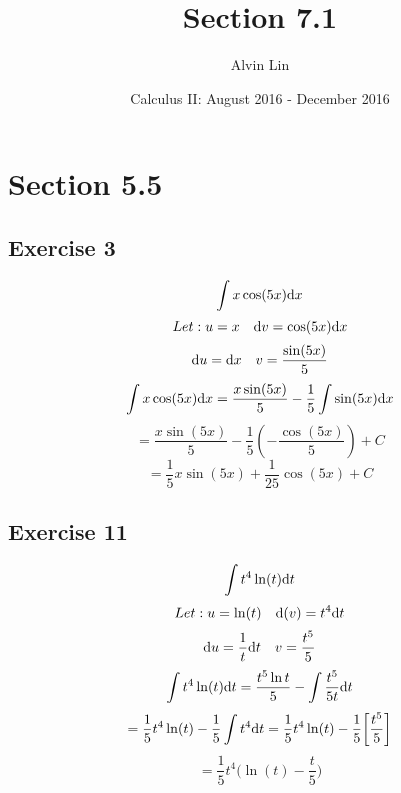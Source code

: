 \documentclass[letterpaper, 12pt]{math}
\title{Section 7.1}
\author{Alvin Lin}
\date{Calculus II: August 2016 - December 2016}
\begin{document}
\maketitle

\section*{Section 5.5}

\subsection*{Exercise 3}
\[ \int{x\cos(5x)\mathrm{d}{x}} \]
\[ Let: u = x\quad \mathrm{d}{v} = \cos(5x)\mathrm{d}{x} \]
\[ \mathrm{d}{u} = \mathrm{d}{x}\quad v = \frac{\sin(5x)}{5} \]
\[ \int{x\cos(5x)\mathrm{d}{x}} =
   \frac{x\sin(5x)}{5}-\frac{1}{5}\int{\sin(5x)\mathrm{d}{x}} \]
\[ = \frac{x\sin(5x)}{5}-\frac{1}{5}(-\frac{\cos(5x)}{5})+C \]
\[ = \frac{1}{5}x\sin(5x)+\frac{1}{25}\cos(5x)+C \]

\subsection*{Exercise 11}
\[ \int{t^{4}\ln(t)\mathrm{d}{t}} \]
\[ Let: u = \ln(t) \quad \mathrm{d}(v) = t^{4}\mathrm{d}{t} \]
\[ \mathrm{d}{u} = \frac{1}{t}\mathrm{d}{t} \quad v = \frac{t^{5}}{5} \]
\[ \int{t^{4}\ln(t)\mathrm{d}{t}} =
   \frac{t^{5}\ln{t}}{5}-\int{\frac{t^{5}}{5t}\mathrm{d}{t}} \]
\[ = \frac{1}{5}t^{4}\ln(t)-\frac{1}{5}\int{t^{4}}\mathrm{d}{t}
   = \frac{1}{5}t^{4}\ln(t)-\frac{1}{5}\bigg[\frac{t^{5}}{5}\bigg] \]
\[ = \frac{1}{5}t^{4}\bigg(\ln(t)-\frac{t}{5}\bigg) \]
\end{document}
